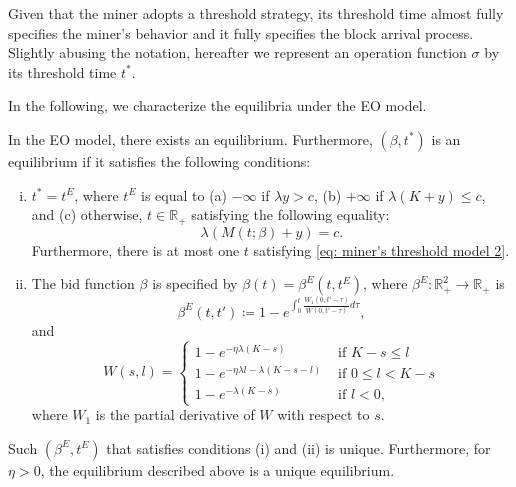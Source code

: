 \documentclass[12pt, letterpaper]{article}
\begin{document}
Given that the miner adopts a threshold strategy, its threshold time almost fully specifies the miner's behavior and it fully specifies the block arrival process. Slightly abusing the notation, hereafter we represent an operation function $\sigma$ by its threshold time $t^*$.




In the following, we characterize the equilibria under the EO model.



\begin{thm}\label{thm: equilibrium closed form model 2}
In the EO model, there exists an equilibrium. Furthermore, $(\beta, t^*)$ is an equilibrium if it satisfies the following conditions:
\begin{enumerate}[(i)]
    \item $t^* = t^E$, where $t^E$ is equal to (a) $-\infty$ if $\lambda y > c$, (b) $+ \infty$ if $\lambda (K + y) \le c$, and (c) otherwise, $t \in \mathbb{R}_+$ satisfying the following equality:
    \begin{equation}\label{eq: miner's threshold model 2}
        \lambda(M(t; \beta) + y) = c.
    \end{equation}
    Furthermore, there is at most one $t$ satisfying \eqref{eq: miner's threshold model 2}.
    \item The bid function $\beta$ is specified by $\beta(t) = \beta^E(t, t^E)$, where $\beta^E: \mathbb{R}_+^2 \to \mathbb{R}_+$ is
    \begin{equation}\label{eq: eqm bid function model 2}
    \beta^E(t, t') \coloneqq 1 - e^{\int_0^t \frac{W_1(0, t' - \tau)}{W(0, t' - \tau)}d\tau},
    \end{equation}
    and
    \begin{equation}
    W(s, l) = \begin{cases}
        1 - e^{- \eta \lambda (K - s)} & \text{ if } K - s \le l\\
        1 - e^{- \eta \lambda l - \lambda (K - s - l)} & \text{ if } 0 \le l < K - s\\
        1 - e^{- \lambda (K - s)} & \text{ if } l < 0,
    \end{cases}
    \end{equation}
    where $W_1$ is the partial derivative of $W$ with respect to $s$.
\end{enumerate}
Such $(\beta^E, t^E)$ that satisfies conditions (i) and (ii) is unique.
Furthermore, for $\eta > 0$, the equilibrium described above is a unique equilibrium.
\end{thm}
\end{document}
